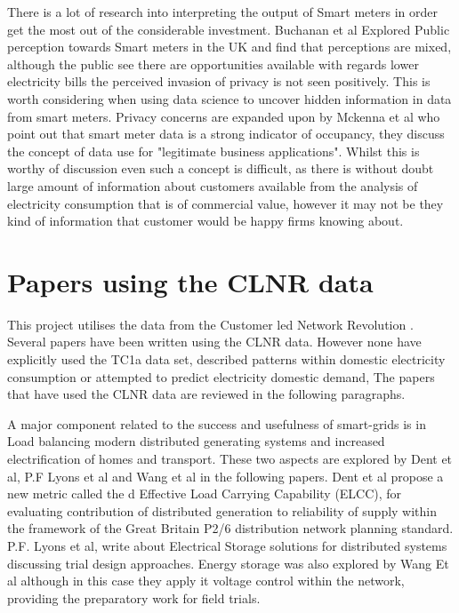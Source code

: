 There is a lot of research into interpreting the output of Smart meters in order get the most out of the considerable investment.
Buchanan et al \cite{buchanan2016} Explored Public perception towards Smart meters in the UK  and find that perceptions are mixed, although the public see there are opportunities available with regards lower electricity bills the perceived invasion of privacy is not seen positively. This is worth considering when using data science to uncover hidden information in data from smart meters. Privacy concerns are expanded upon by Mckenna et al  \cite{mckenna2012} who point out that smart meter data is a strong indicator of occupancy, they discuss the concept of data use for "legitimate business applications". Whilst this is worthy of discussion even such a concept is difficult, as there is without doubt large amount of information about customers available from the analysis of electricity consumption that is of commercial value, however it may not be they kind of information that customer would be happy firms knowing about. 


\section{Papers using the CLNR data}
This project utilises the data from the Customer led Network Revolution  \cite{customerlednetworkrevolution}. Several papers have been written using the CLNR data. However none have explicitly used the TC1a data set, described patterns within domestic electricity consumption or attempted to predict electricity domestic demand, The papers that have used the CLNR data are reviewed in the following paragraphs.

A major component related to the success and usefulness of smart-grids is in Load balancing modern distributed generating systems and increased electrification of homes and transport. These two aspects are explored by Dent et al, P.F Lyons et al and Wang et al in the following papers.
Dent et al \cite{dent2015} propose a new metric called the d Effective Load Carrying Capability (ELCC), for evaluating contribution of distributed generation to reliability of supply within the framework of the Great Britain P2/6 distribution network planning standard. 
P.F. Lyons et al, write about Electrical Storage solutions for distributed systems \cite{lyons2015} discussing trial design approaches. Energy storage was also explored by Wang Et al \cite{wang2014} although in this case they apply it voltage control within the network, providing the preparatory work for field trials.


